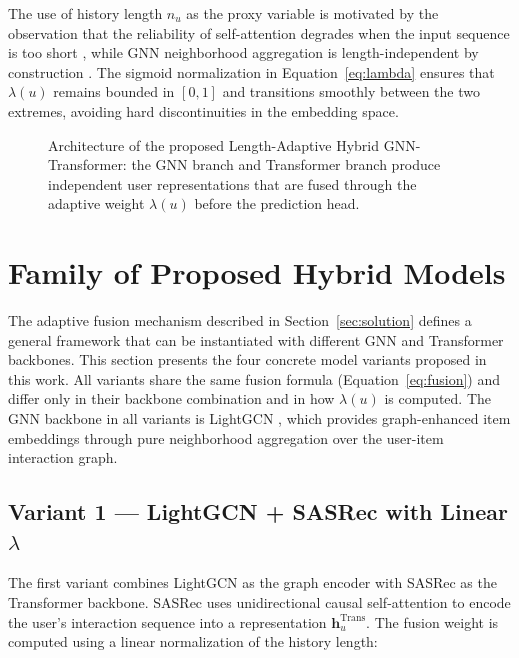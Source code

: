 \documentclass[12pt,a4paper]{report}
\begin{document}
The use of history length \(n_u\) as the proxy variable is motivated by the
observation that the reliability of self-attention degrades when the input
sequence is too short \citep{kang2018sasrec, sun2019bert4rec}, while GNN
neighborhood aggregation is length-independent by construction
\citep{he2020lightgcn}. The sigmoid normalization in
Equation~\ref{eq:lambda} ensures that \(\lambda(u)\) remains bounded in
\([0, 1]\) and transitions smoothly between the two extremes, avoiding hard
discontinuities in the embedding space.

\begin{figure}[h]
    \centering
    \caption{Architecture of the proposed Length-Adaptive Hybrid
    GNN-Transformer: the GNN branch and Transformer branch produce independent
    user representations that are fused through the adaptive weight
    \(\lambda(u)\) before the prediction head.}
    \label{fig:hybrid_arch}
\end{figure}


\section{Family of Proposed Hybrid Models}
\label{sec:family}

The adaptive fusion mechanism described in Section~\ref{sec:solution} defines
a general framework that can be instantiated with different GNN and Transformer
backbones. This section presents the four concrete model variants proposed in
this work. All variants share the same fusion formula
(Equation~\ref{eq:fusion}) and differ only in their backbone combination and
in how \(\lambda(u)\) is computed. The GNN backbone in all variants is
LightGCN \citep{he2020lightgcn}, which provides graph-enhanced item embeddings
through pure neighborhood aggregation over the user-item interaction graph.

\subsection{Variant 1 — LightGCN + SASRec with Linear \(\lambda\)}

The first variant combines LightGCN as the graph encoder with SASRec
\citep{kang2018sasrec} as the Transformer backbone. SASRec uses unidirectional
causal self-attention to encode the user's interaction sequence into a
representation \(\mathbf{h}_u^{\text{Trans}}\). The fusion weight is computed
using a linear normalization of the history length:
\end{document}
